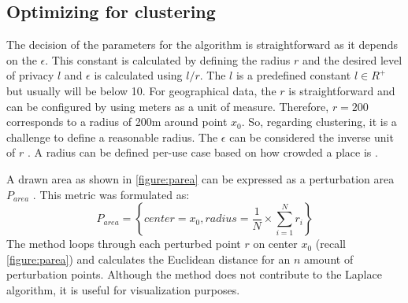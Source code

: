 \subsection{Optimizing for clustering}
The decision of the parameters for the algorithm is straightforward as it depends on the $\epsilon$. \label{paragraph:choosing-r}
This constant is calculated by defining the radius $r$ and the desired level of privacy $l$ and $\epsilon$ is calculated using $l/r$.
The $l$ is a predefined constant $l \in R^+$ but usually will be below 10.
For geographical data, the $r$ is straightforward and can be configured by using meters as a unit of measure.
Therefore, $r = 200$ corresponds to a radius of 200m around point $x_0$.
So, regarding clustering, it is a challenge to define a reasonable radius. \newline
The $\epsilon$ can be considered the inverse unit of $r$ \citep{DBLP:journals/corr/abs-1212-1984}.
A radius can be defined per-use case based on how crowded a place is \citep{chatzikokolakis_constructing_2015}.

A drawn area as shown in \ref{figure:parea} can be expressed as a perturbation area $P_{area}$ \citep{yan_perturb_2022-2}.
This metric was formulated as:
\begin{equation}
  P_{area}=\left\{ center = x_{0},radius = \frac{1}{N}\times \sum _{i=1}^{N}r_{i}\right\}
\end{equation}
The method loops through each perturbed point $r$ on center $x_0$ (recall \ref{figure:parea}) and calculates the Euclidean distance for an $n$ amount of perturbation points.
Although the method does not contribute to the Laplace algorithm, it is useful for visualization purposes.

